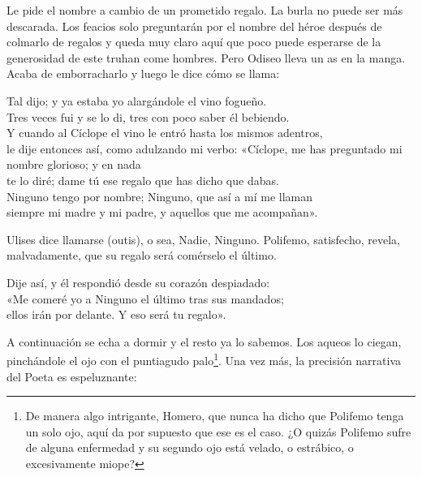 Le pide el nombre a cambio de un prometido regalo. La burla no puede ser más descarada. Los feacios solo preguntarán por el nombre del héroe después de colmarlo de regalos y queda muy claro aquí que poco puede esperarse de la generosidad de este truhan come hombres. Pero Odiseo lleva un as en la manga. Acaba de emborracharlo y luego le dice cómo se llama:

\begin{versocita}
Tal dijo; y ya estaba yo alargándole el vino fogueño.\\
Tres veces fui y se lo di, tres con poco saber él bebiendo.\\
Y cuando al Cíclope el vino le entró hasta los mismos adentros,\\
le dije entonces así, como adulzando mi verbo:
\stanzabreak
«Cíclope, me has preguntado mi nombre glorioso; y en nada\\
te lo diré; dame tú ese regalo que has dicho que dabas.\\
Ninguno tengo por nombre; Ninguno, que así a mí me llaman\\
siempre mi madre y mi padre, y aquellos que me acompañan».
\end{versocita}

Ulises dice llamarse  (outis), o sea, Nadie, Ninguno. Polifemo, satisfecho, revela, malvadamente, que su regalo será comérselo el último.

\begin{versocita}
Dije así, y él respondió desde su corazón despiadado:\\
«Me comeré yo a Ninguno el último tras sus mandados;\\
ellos irán por delante. Y eso será tu regalo».
\end{versocita}

A continuación se echa a dormir y el resto ya lo sabemos. Los aqueos lo ciegan, pinchándole el ojo con el puntiagudo palo\footnote{De manera algo intrigante, Homero, que nunca ha dicho que Polifemo tenga un solo ojo, aquí da por supuesto que ese es el caso. ¿O quizás Polifemo sufre de alguna enfermedad y su segundo ojo está velado, o estrábico, o excesivamente miope?}. Una vez más, la precisión narrativa del Poeta es espeluznante:

